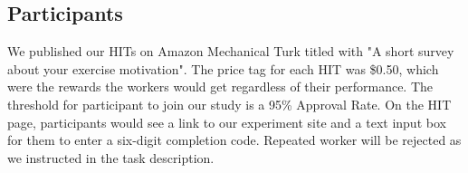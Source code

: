 \subsection{Participants
}
We published our HITs on Amazon Mechanical Turk titled with "A short survey about your exercise motivation". The price tag for each HIT was \$0.50, which were the rewards the workers would get regardless of their performance. The threshold for participant to join our study is a 95\% Approval Rate. On the HIT page, participants would see a link to our experiment site and a text input box for them to enter a six-digit completion code. Repeated worker will be rejected as we instructed in the task description.
